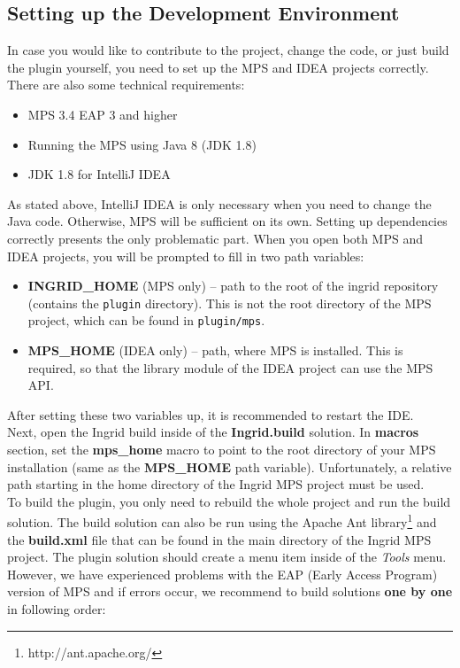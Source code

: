 \subsection{Setting up the Development Environment}
\label{chap:dev_env}

In case you would like to contribute to the project, change the code, or just build the plugin yourself, you need to set up the MPS and IDEA projects correctly.
There are also some technical requirements:

\begin{itemize}
	\item MPS 3.4 EAP 3 and higher
	\item Running the MPS using Java 8 (JDK 1.8)
	\item JDK 1.8 for IntelliJ IDEA
\end{itemize}

As stated above, IntelliJ IDEA is only necessary when you need to change the Java code.
Otherwise, MPS will be sufficient on its own.
Setting up dependencies correctly presents the only problematic part.
When you open both MPS and IDEA projects, you will be prompted to fill in two path variables:

\begin{itemize}
	\item \textbf{INGRID{\_}HOME} (MPS only) -- path to the root of the ingrid repository (contains the \texttt{plugin} directory). This is not the root directory of the MPS project, which can be found in \texttt{plugin/mps}.

	\item \textbf{MPS{\_}HOME} (IDEA only) -- path, where MPS is installed. This is required, so that the library module of the IDEA project can use the MPS API.
\end{itemize}

After setting these two variables up, it is recommended to restart the IDE.
\\

Next, open the Ingrid build inside of the \textbf{Ingrid.build} solution. In \textbf{macros} section, set the \textbf{mps{\_}home} macro to point to the root directory of your MPS installation (same as the \textbf{MPS{\_}HOME} path variable).
Unfortunately, a relative path starting in the home directory of the Ingrid MPS project must be used.
\\

To build the plugin, you only need to rebuild the whole project and run the build solution.
The build solution can also be run using the Apache Ant library\footnote{http://ant.apache.org/} and the \textbf{build.xml} file that can be found in the main directory of the Ingrid MPS project.
The plugin solution should create a menu item inside of the \textit{Tools} menu.
However, we have experienced problems with the EAP (Early Access Program) version of MPS and if errors occur, we recommend to build solutions \textbf{one by one} in following order:

